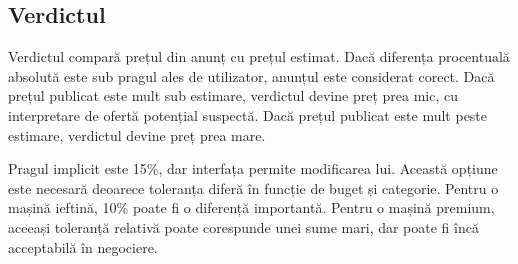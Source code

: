 \subsection{Verdictul}
\label{sec:models-verdict}

Verdictul compară prețul din anunț cu prețul estimat. Dacă diferența procentuală absolută este sub pragul ales de utilizator, anunțul este considerat corect. Dacă prețul publicat este mult sub estimare, verdictul devine preț prea mic, cu interpretare de ofertă potențial suspectă. Dacă prețul publicat este mult peste estimare, verdictul devine preț prea mare.

Pragul implicit este 15\%, dar interfața permite modificarea lui. Această opțiune este necesară deoarece toleranța diferă în funcție de buget și categorie. Pentru o mașină ieftină, 10\% poate fi o diferență importantă. Pentru o mașină premium, aceeași toleranță relativă poate corespunde unei sume mari, dar poate fi încă acceptabilă în negociere.
